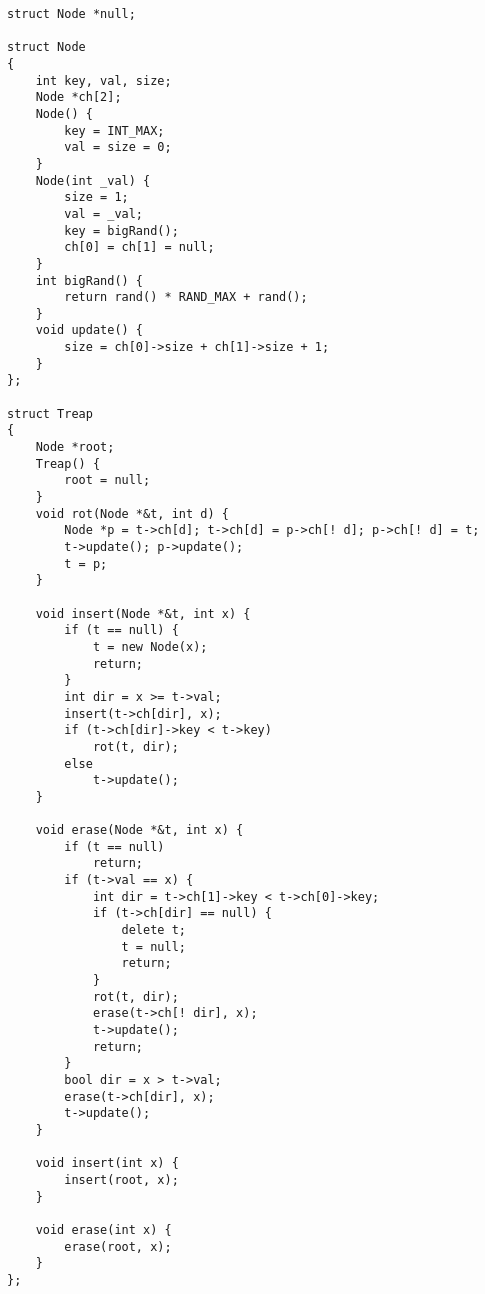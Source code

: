 
\begin{lstlisting}
struct Node *null;

struct Node
{
	int key, val, size;
	Node *ch[2];
	Node() {
		key = INT_MAX;
		val = size = 0;
	}
	Node(int _val) {
		size = 1;
		val = _val;
		key = bigRand();
		ch[0] = ch[1] = null;
	}
	int bigRand() {
		return rand() * RAND_MAX + rand();
	}
	void update() {
		size = ch[0]->size + ch[1]->size + 1;
	}
};

struct Treap
{
	Node *root;
	Treap() {
		root = null;
	}
	void rot(Node *&t, int d) {
		Node *p = t->ch[d]; t->ch[d] = p->ch[! d]; p->ch[! d] = t;
		t->update(); p->update();
		t = p;
	}
	
	void insert(Node *&t, int x) {
		if (t == null) {
			t = new Node(x);
			return;
		}
		int dir = x >= t->val;
		insert(t->ch[dir], x);
		if (t->ch[dir]->key < t->key)
			rot(t, dir);
		else
			t->update();
	}
	
	void erase(Node *&t, int x) {
		if (t == null)
			return;
		if (t->val == x) {
			int dir = t->ch[1]->key < t->ch[0]->key;
			if (t->ch[dir] == null) {
				delete t;
				t = null;
				return;
			}
			rot(t, dir);
			erase(t->ch[! dir], x);
			t->update();
			return;
		}
		bool dir = x > t->val;
		erase(t->ch[dir], x);
		t->update();
	}
	
	void insert(int x) {
		insert(root, x);
	}
	
	void erase(int x) {
		erase(root, x);
	}
};
\end{lstlisting}
